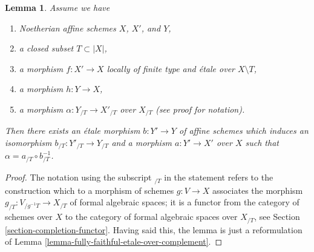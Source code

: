 \documentclass[10pt,a4paper]{amsart}
\theoremstyle{plain}
\newtheorem{lemma}[subsection]{Lemma}
\theoremstyle{definition}
\theoremstyle{remark}
\numberwithin{equation}{subsection}
\begin{document}
\begin{lemma}
\label{lemma-algebraize-morphism-rig-etale}
Assume we have
\begin{enumerate}
\item Noetherian affine schemes $X$, $X'$, and $Y$,
\item a closed subset $T \subset |X|$,
\item a morphism $f : X' \to X$ locally of finite type
and \'etale over $X \setminus T$,
\item a morphism $h : Y \to X$,
\item a morphism $\alpha : Y_{/T} \to X'_{/T}$ over $X_{/T}$
(see proof for notation).
\end{enumerate}
Then there exists an \'etale morphism $b : Y' \to Y$ of affine schemes
which induces an isomorphism $b_{/T} : Y'_{/T} \to Y_{/T}$
and a morphism $a : Y' \to X'$ over $X$
such that $\alpha = a_{/T} \circ b_{/T}^{-1}$.
\end{lemma}

\begin{proof}
The notation using the subscript ${}_{/T}$ in the statement
refers to the construction which to a morphism of schemes $g : V \to X$
associates the morphism $g_{/T} : V_{/g^{-1}T} \to X_{/T}$ of formal
algebraic spaces; it is a functor from the category of schemes over $X$
to the category of formal algebraic spaces over $X_{/T}$, see
Section \ref{section-completion-functor}.
Having said this, the lemma is just a reformulation of
Lemma \ref{lemma-fully-faithful-etale-over-complement}.
\end{proof}
\end{document}
